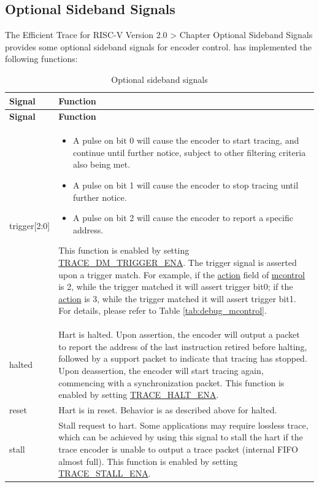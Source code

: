 \documentclass[main\_\_EN.tex]{subfiles}
\begin{document}
\subsection{Optional Sideband Signals}

The Efficient Trace for RISC-V Version 2.0 > Chapter Optional Sideband Signals provides some optional sideband signals for encoder control. \chipname{} has implemented the following functions:

\begin{longtable}[c]{ |l|L{12cm}| }
    \caption{Optional sideband signals}
    \label{tab:sideband_signal}
    \\\hline{}
    \textbf{Signal} & \textbf{Function}  \\\hline
    \endfirsthead
    \hline{}
     \textbf{Signal} & \textbf{Function}  \\\hline
    \endhead
    \endfoot
    \endlastfoot

    trigger[2:0] &
        \begin{itemize}
            \item A pulse on bit 0 will cause the encoder to start tracing, and continue until further notice, subject to other filtering criteria also being met.
            \item A pulse on bit 1 will cause the encoder to stop tracing until further notice.
            \item A pulse on bit 2 will cause the encoder to report a specific address.
        \end{itemize}
        This function is enabled by setting \hyperref[fielddesc:TRACEDMTRIGGERENA]{TRACE\_DM\_TRIGGER\_ENA}. The trigger signal is asserted upon a  trigger match. For example, if the \hyperref[fielddesc:MCONTROLACTION]{action} field of \hyperref[regdesc:MCONTROL]{mcontrol} is 2, while the trigger matched it will assert trigger bit0; if the \hyperref[fielddesc:MCONTROLACTION]{action} is 3, while the trigger matched it will assert trigger bit1. For details, please refer to Table \ref{tab:debug_mcontrol}.\\\hline

    halted & Hart is halted. Upon assertion, the encoder will output a packet to report the address of the last instruction retired before halting, followed by a support packet to indicate that tracing has stopped. Upon deassertion, the encoder will start tracing again, commencing with a synchronization packet. This function is enabled by setting \hyperref[fielddesc:TRACEHALTENA]{TRACE\_HALT\_ENA}. \\\hline

    reset & Hart is in reset. Behavior is as described above for halted. \\\hline

    stall & Stall request to hart. Some applications may require lossless trace, which can be achieved by using this signal to stall the hart if the trace encoder is unable to output a trace packet (internal FIFO almost full). This function is enabled by setting \hyperref[fielddesc:TRACESTALLENA]{TRACE\_STALL\_ENA}. \\\hline

\end{longtable}
\end{document}
